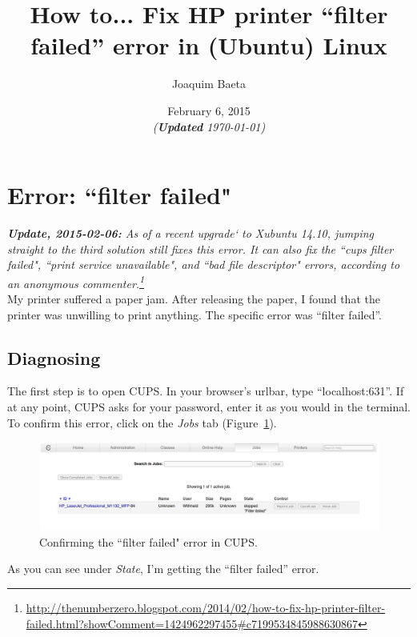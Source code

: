 \documentclass[12pt, a4paper]{article}
\title{\textbf{How to... Fix HP printer “filter failed” error in (Ubuntu) Linux }}
\author{Joaquim Baeta}
\date{February 6, 2015\\ \normalsize \emph{(\textbf{Updated} \today)}}
\begin{document}
\maketitle

\tableofcontents
\vspace{1cm}

\section*{Error: ``filter failed"}

\noindent \emph{\textbf{Update, 2015-02-06:} As of a recent upgrade` to Xubuntu 14.10, jumping straight to the third solution still fixes this error. It can also fix the ``cups filter failed", ``print service unavailable", and ``bad file descriptor" errors, according to an anonymous commenter.\footnote{\url{http://thenumberzero.blogspot.com/2014/02/how-to-fix-hp-printer-filter-failed.html?showComment=1424962297455\#c7199534845988630867}}}\\

\noindent My printer suffered a paper jam. After releasing the paper, I found that the printer was unwilling to print anything. The specific error was “filter failed”.

\subsection*{Diagnosing}

The first step is to open CUPS. In your browser's urlbar, type “localhost:631”. If at any point, CUPS asks for your password, enter it as you would in the terminal. To confirm this error, click on the \emph{Jobs} tab (Figure~\ref{fig1}). 

\begin{figure}[h]
  \centering
  \includegraphics[width=1\textwidth]{imgs/filter-failed-1.png}
  \caption{Confirming the ``filter failed" error in CUPS.}
  \label{fig1}
\end{figure}

\noindent As you can see under \emph{State}, I'm getting the “filter failed” error.
\end{document}
